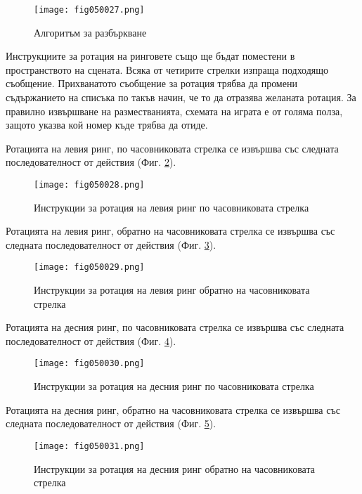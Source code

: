 \begin{figure}[H]
  \centering
  \texttt{[image: fig050027.png]}
  \caption{Алгоритъм за разбъркване}
\label{fig050027}
\end{figure}

Инструкциите за ротация на ринговете също ще бъдат поместени в пространството на сцената. Всяка от четирите стрелки изпраща подходящо съобщение. Прихванатото съобщение за ротация трябва да промени съдържанието на списъка по такъв начин, че то да отразява желаната ротация. За правилно извършване на разместванията, схемата на играта е от голяма полза, защото указва кой номер къде трябва да отиде. 

Ротацията на левия ринг, по часовниковата стрелка се извършва със следната последователност от действия (Фиг. \ref{fig050028}).

\begin{figure}[H]
  \centering
  \texttt{[image: fig050028.png]}
  \caption{Инструкции за ротация на левия ринг по часовниковата стрелка}
\label{fig050028}
\end{figure}

Ротацията на левия ринг, обратно на часовниковата стрелка се извършва със следната последователност от действия (Фиг. \ref{fig050029}).

\begin{figure}[H]
  \centering
  \texttt{[image: fig050029.png]}
  \caption{Инструкции за ротация на левия ринг обратно на часовниковата стрелка}
\label{fig050029}
\end{figure}

Ротацията на десния ринг, по часовниковата стрелка се извършва със следната последователност от действия (Фиг. \ref{fig050030}).

\begin{figure}[H]
  \centering
  \texttt{[image: fig050030.png]}
  \caption{Инструкции за ротация на десния ринг по часовниковата стрелка}
\label{fig050030}
\end{figure}

Ротацията на десния ринг, обратно на часовниковата стрелка се извършва със следната последователност от действия (Фиг. \ref{fig050031}).

\begin{figure}[H]
  \centering
  \texttt{[image: fig050031.png]}
  \caption{Инструкции за ротация на десния ринг обратно на часовниковата стрелка}
\label{fig050031}
\end{figure}


